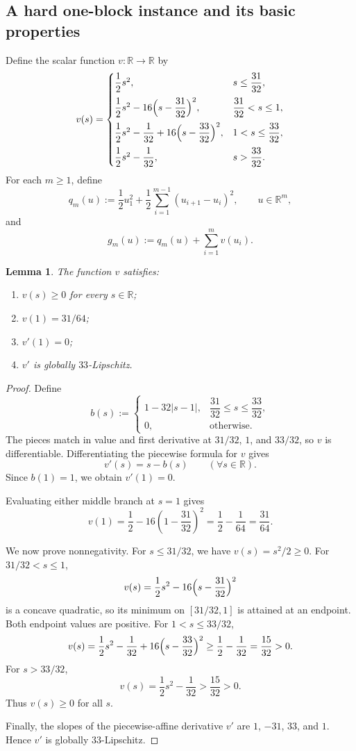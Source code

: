 \documentclass[11pt]{article}
\newtheorem{lemma}[theorem]{Lemma}
\newcommand{\R}{\mathbb{R}}
\begin{document}
\subsection{A hard one-block instance and its basic properties}
\label{app:det-one-block}

Define the scalar function $v:\R\to\R$ by
\[
v(s)=
\begin{cases}
\dfrac12 s^2, & s\le \dfrac{31}{32},\\[0.8em]
\dfrac12 s^2-16\Bigl(s-\dfrac{31}{32}\Bigr)^2, & \dfrac{31}{32}<s\le 1,\\[0.8em]
\dfrac12 s^2-\dfrac{1}{32}+16\Bigl(s-\dfrac{33}{32}\Bigr)^2, & 1<s\le \dfrac{33}{32},\\[0.8em]
\dfrac12 s^2-\dfrac{1}{32}, & s>\dfrac{33}{32}.
\end{cases}
\]
For each $m\ge 1$, define
\[
q_m(u):=\frac12 u_1^2+\frac12\sum_{i=1}^{m-1}(u_{i+1}-u_i)^2,
\qquad
u\in\R^m,
\]
and
\[
g_m(u):=q_m(u)+\sum_{i=1}^m v(u_i).
\]

\begin{lemma}
\label{lem:v-basic}
The function $v$ satisfies:
\begin{enumerate}[label=(\roman*),leftmargin=1.5em]
    \item $v(s)\ge 0$ for every $s\in\R$;
    \item $v(1)=31/64$;
    \item $v'(1)=0$;
    \item $v'$ is globally $33$-Lipschitz.
\end{enumerate}
\end{lemma}

\begin{proof}
Define
\[
b(s):=
\begin{cases}
1-32|s-1|, & \dfrac{31}{32}\le s\le \dfrac{33}{32},\\[0.4em]
0, & \text{otherwise}.
\end{cases}
\]
The pieces match in value and first derivative at \(31/32\), \(1\), and \(33/32\), so \(v\) is differentiable.
Differentiating the piecewise formula for \(v\) gives
\[
v'(s)=s-b(s)
\qquad (\forall s\in\R).
\]
Since $b(1)=1$, we obtain $v'(1)=0$.

Evaluating either middle branch at $s=1$ gives
\[
v(1)=\frac12-16\left(1-\frac{31}{32}\right)^2=\frac12-\frac{1}{64}=\frac{31}{64}.
\]

We now prove nonnegativity. For $s\le 31/32$, we have $v(s)=s^2/2\ge 0$. For $31/32<s\le 1$,
\[
v(s)=\frac12 s^2-16\Bigl(s-\frac{31}{32}\Bigr)^2
\]
is a concave quadratic, so its minimum on $[31/32,1]$ is attained at an endpoint. Both endpoint values are positive. For $1<s\le 33/32$,
\[
v(s)=\frac12 s^2-\frac{1}{32}+16\Bigl(s-\frac{33}{32}\Bigr)^2\ge \frac12-\frac{1}{32}=\frac{15}{32}>0.
\]
For $s>33/32$,
\[
v(s)=\frac12 s^2-\frac{1}{32}>\frac{15}{32}>0.
\]
Thus $v(s)\ge 0$ for all $s$.

Finally, the slopes of the piecewise-affine derivative \(v'\) are \(1\), \(-31\), \(33\), and \(1\). Hence \(v'\) is globally \(33\)-Lipschitz.
\end{proof}
\end{document}
